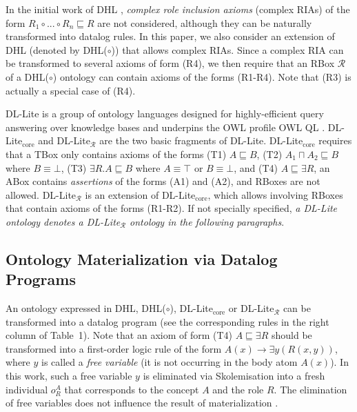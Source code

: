 In the initial work of DHL \cite{GrosofHVD03}, \emph{complex role inclusion axioms} (complex RIAs) of
the form $R_1\circ...\circ R_n\sqsubseteq R$ are not considered, although they can be
naturally transformed into datalog rules.
In this paper, we also consider an extension of DHL (denoted by DHL($\circ$))
that allows complex RIAs. Since a complex RIA can be transformed to
several axioms of form (R4), we then require that an
RBox $\mathcal{R}$ of a DHL($\circ$) ontology can contain
axioms of the forms (R1-R4). Note that (R3) is actually a special
case of (R4).

DL-Lite is a group of ontology languages designed for highly-efficient
query answering over knowledge bases
and underpins the OWL profile OWL QL \cite{CalvaneseGLLR07}.
DL-Lite$_{\text{core}}$ and DL-Lite$_{\mathcal{R}}$ are the two basic fragments
of DL-Lite.
DL-Lite$_{\text{core}}$ requires that a TBox only contains axioms of the forms (T1) $A\sqsubseteq B$,
(T2) $A_1\sqcap A_2\sqsubseteq B$ where $B\equiv\bot$, (T3) $\exists R.A\sqsubseteq B$
where $A\equiv\top$ or $B\equiv\bot$, and (T4) $A\sqsubseteq\exists R$,
an ABox contains \emph{assertions} of the forms (A1) and (A2), and
RBoxes are not allowed. DL-Lite$_{\mathcal{R}}$ is an extension of DL-Lite$_{\text{core}}$,
which allows involving RBoxes that contain axioms of the forms (R1-R2).
If not specially specified, \emph{a DL-Lite ontology denotes a DL-Lite$_{\mathcal{R}}$ ontology
in the following paragraphs}.


\subsection{Ontology Materialization via Datalog Programs}

An ontology
expressed in DHL, DHL($\circ$), DL-Lite$_{\text{core}}$ or DL-Lite$_{\mathcal{R}}$ can be transformed into a datalog program
(see the corresponding rules in the right column of Table~1).
Note that an axiom of form (T4) $A\sqsubseteq\exists R$ should be
transformed into a
first-order logic rule of the form $A(x)\rightarrow \exists y(R(x,y))$, where $y$ is called a \emph{free variable} (it is
not occurring in the body atom $A(x)$).
In this work, such a free variable $y$ is eliminated via Skolemisation into a fresh individual $o_{R}^A$
that corresponds to the concept $A$ and the role $R$. The elimination of free variables
does not influence the result of materialization \cite{CalvaneseGLLR07}.

